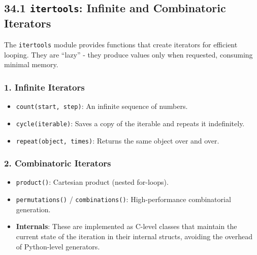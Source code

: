 \hypertarget{itertools-infinite-and-combinatoric-iterators}{%
\subsection{\texorpdfstring{34.1 \texttt{itertools}: Infinite and
Combinatoric
Iterators}{34.1 itertools: Infinite and Combinatoric Iterators}}\label{itertools-infinite-and-combinatoric-iterators}}

The \passthrough{\lstinline!itertools!} module provides functions that
create iterators for efficient looping. They are ``lazy'' - they produce
values only when requested, consuming minimal memory.

\hypertarget{infinite-iterators}{%
\subsubsection{1. Infinite Iterators}\label{infinite-iterators}}

\begin{itemize}
\tightlist
\item
  \passthrough{\lstinline!count(start, step)!}: An infinite sequence of
  numbers.
\item
  \passthrough{\lstinline!cycle(iterable)!}: Saves a copy of the
  iterable and repeats it indefinitely.
\item
  \passthrough{\lstinline!repeat(object, times)!}: Returns the same
  object over and over.
\end{itemize}

\hypertarget{combinatoric-iterators}{%
\subsubsection{2. Combinatoric Iterators}\label{combinatoric-iterators}}

\begin{itemize}
\tightlist
\item
  \passthrough{\lstinline!product()!}: Cartesian product (nested
  for-loops).
\item
  \passthrough{\lstinline!permutations()!} /
  \passthrough{\lstinline!combinations()!}: High-performance
  combinatorial generation.
\item
  \textbf{Internals}: These are implemented as C-level classes that
  maintain the current state of the iteration in their internal structs,
  avoiding the overhead of Python-level generators.
\end{itemize}

